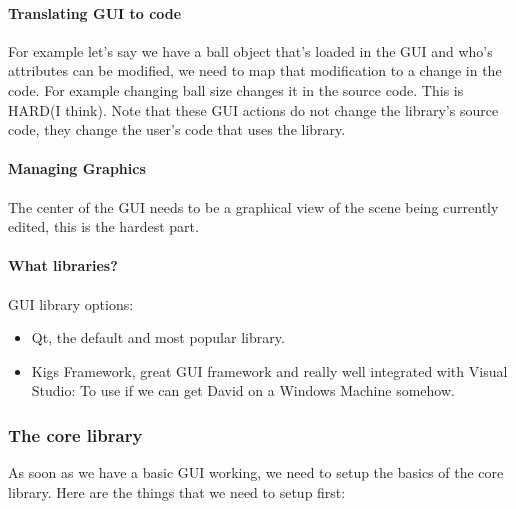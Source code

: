 \documentclass{article}
\begin{document}
	\paragraph{Translating GUI to code}
	For example let's say we have a ball object that's loaded in the GUI and who's attributes can be modified, we need to map that modification to a change in the code. For example changing ball size changes it in the source code. This is HARD(I think).
	Note that these GUI actions do not change the library's source code, they change the user's code that uses the library.
	\paragraph{Managing Graphics}
	The center of the GUI needs to be a graphical view of the scene being currently edited, this is the hardest part.
	\paragraph{What libraries?}
	GUI library options:
	\begin{itemize}
		\item Qt, the default and most popular library.
		\item Kigs Framework, great GUI framework and really well integrated with Visual Studio: To use if we can get David on a Windows Machine somehow.
	\end{itemize}
	\subsubsection{The core library}
	As soon as we have a basic GUI working, we need to setup the basics of the core library. Here are the things that we need to setup first:
\end{document}
